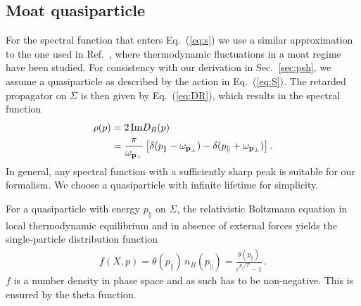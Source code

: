 \documentclass[reprint,superscriptaddress,english,preprintnumbers,amsmath,amssymb,aps,prx]{revtex4-2}
\def\Eq#1{Eq.~(\ref{#1})}
\def\Sec#1{Sec.~\ref{#1}}
\begin{document}
\subsection{Moat quasiparticle}\label{sec:quasimoto}

For the spectral function that enters \Eq{eq:s} we use a similar approximation to the one used in Ref.\ \cite{Pisarski:2021qof}, where thermodynamic fluctuations in a moat regime have been studied. For consistency with our derivation in \Sec{sec:psh}, we assume a quasiparticle
as described by the action in \Eq{eq:S}.
The retarded propagator on $\Sigma$ is then given by \Eq{eq:DR}, which results in the spectral function
\begin{align}\label{eq:quasispec}
\begin{split}
\rho(p) &= 2\, {\rm Im} D_R(p)\\ 
&= \frac{\pi}{\omega_{\bold{p}_\perp}}\,\big[\delta(p_\parallel - \omega_{\bold{p}_\perp})-\delta(p_\parallel + \omega_{\bold{p}_\perp})\big]\,.
\end{split}
\end{align}
In general, any spectral function with a sufficiently sharp peak is suitable for our formalism. We choose a quasiparticle with infinite lifetime for simplicity.

For a quasiparticle with energy $p_\parallel$ on $\Sigma$, the relativistic Boltzmann equation in local thermodynamic equilibrium and in absence of external forces yields the single-particle distribution function
\begin{align}\label{eq:nB}
f(X,p) = \theta(p_\parallel)\,n_B(p_\parallel) = \frac{\theta(p_\parallel)}{e^{p_\parallel/T}-1}\,.
\end{align}
$f$ is a number density in phase space and as such has to be non-negative. This is ensured by the theta function.
\end{document}
